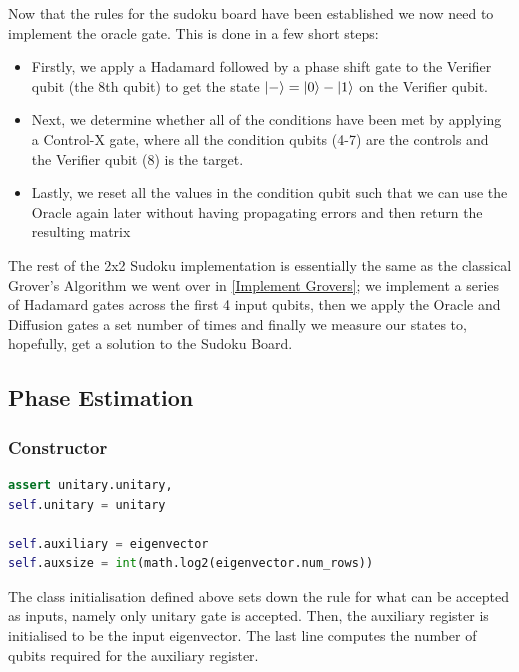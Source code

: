 \documentclass{article}
\begin{document}
Now that the rules for the sudoku board have been established we now need to implement the oracle gate. This is done in a few short steps:
\begin{itemize}
    \item Firstly, we apply a Hadamard followed by a phase shift gate to the Verifier qubit (the 8th qubit) to get the state $\ket{-} = \ket{0} - \ket{1}$ on the Verifier qubit.
    \item Next, we determine whether all of the conditions have been met by applying a Control-X gate, where all the condition qubits (4-7) are the controls and the Verifier qubit (8) is the target.
    \item Lastly, we reset all the values in the condition qubit such that we can use the Oracle again later without having propagating errors and then return the resulting matrix
\end{itemize}

The rest of the 2x2 Sudoku implementation is essentially the same as the classical Grover's Algorithm we went over in \ref{Implement Grovers}; we implement a series of Hadamard gates across the first 4 input qubits, then we apply the Oracle and Diffusion gates a set number of times and finally we measure our states to, hopefully, get a solution to the Sudoku Board.

\subsection{Phase Estimation}
\subsubsection{Constructor}

\begin{file}
\begin{center}
\begin{lstlisting}[linewidth=13cm,language=Python]
assert unitary.unitary, 
self.unitary = unitary

self.auxiliary = eigenvector
self.auxsize = int(math.log2(eigenvector.num_rows))
\end{lstlisting}
\end{center}
\end{file}
The class initialisation defined above sets down the rule for what can be accepted as inputs, namely only unitary gate is accepted. Then, the auxiliary register is initialised to be the input eigenvector. The last line computes the number of qubits required for the auxiliary register.
\end{document}
